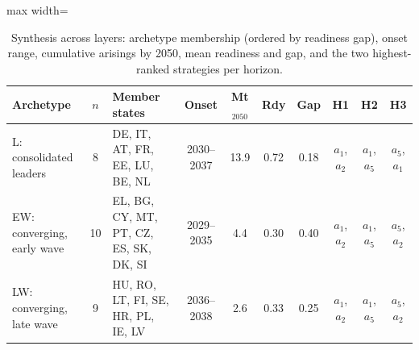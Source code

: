 \begin{table}[pos=t]\centering\scriptsize
\caption{Synthesis across layers: archetype membership (ordered by readiness gap), onset range, cumulative arisings by 2050, mean readiness and gap, and the two highest-ranked strategies per horizon.}
\label{tab:synthesis}
\begin{adjustbox}{max width=\linewidth}\begin{tabular}{@{}lcp{4.2cm}ccccccc@{}}\toprule
Archetype & $n$ & Member states & Onset & Mt$_{2050}$ & Rdy & Gap & H1 & H2 & H3 \\ \midrule
L: consolidated leaders & 8 & DE, IT, AT, FR, EE, LU, BE, NL & 2030–2037 & 13.9 & 0.72 & 0.18 & $a_1$, $a_2$ & $a_1$, $a_5$ & $a_5$, $a_1$ \\
EW: converging, early wave & 10 & EL, BG, CY, MT, PT, CZ, ES, SK, DK, SI & 2029–2035 & 4.4 & 0.30 & 0.40 & $a_1$, $a_2$ & $a_1$, $a_5$ & $a_5$, $a_2$ \\
LW: converging, late wave & 9 & HU, RO, LT, FI, SE, HR, PL, IE, LV & 2036–2038 & 2.6 & 0.33 & 0.25 & $a_1$, $a_2$ & $a_1$, $a_5$ & $a_5$, $a_2$ \\
\bottomrule\end{tabular}\end{adjustbox}\end{table}
